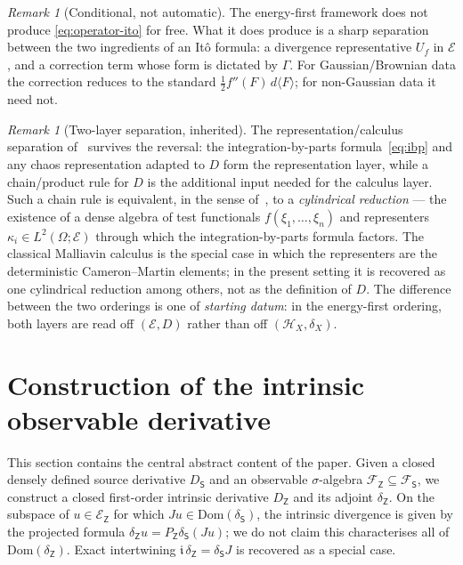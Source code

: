 \documentclass[11pt,reqno]{amsart}
\theoremstyle{plain}
\theoremstyle{definition}
\theoremstyle{remark}
\newtheorem{remark}[theorem]{Remark}
\newcommand{\Dom}{\mathrm{Dom}}
\newcommand{\Energy}{\mathcal{E}}
\newcommand{\Source}{\mathsf{S}}
\newcommand{\Obs}{\mathsf{Z}}
\renewcommand{\iota}{\mathfrak{i}}
\newcommand{\Carre}{\Gamma}
\begin{document}
\begin{remark}[Conditional, not automatic]\label{rem:conditional}
The energy-first framework does not produce \cref{eq:operator-ito}
for free. What it does produce is a sharp separation between the
two ingredients of an It\^o formula: a divergence representative
$U_f$ in $\Energy$, and a correction term whose form is dictated by
$\Carre$. For Gaussian/Brownian data the correction reduces to the
standard $\tfrac12 f''(F)\,d\langle F\rangle$; for non-Gaussian data
it need not.
\end{remark}

\begin{remark}[Two-layer separation, inherited]\label{rem:two-layer}
The representation/calculus separation
of~\cite{Fontes-OperatorDerivative} survives the reversal: the
integration-by-parts formula~\eqref{eq:ibp} and any chaos representation
adapted to $D$ form the representation layer, while a chain/product
rule for $D$ is the additional input needed for the calculus layer. Such
a chain rule is equivalent, in the sense
of~\cite[Thm.~B]{Fontes-OperatorDerivative}, to a \emph{cylindrical
reduction} --- the existence of a dense algebra of test functionals
$f(\xi_1,\dots,\xi_n)$ and representers $\kappa_i\in L^2(\Omega;\Energy)$
through which the integration-by-parts formula factors. The classical
Malliavin calculus is the special case in which the representers are the
deterministic Cameron--Martin elements; in the present setting it is
recovered as one cylindrical reduction among others, not as the
definition of $D$. The difference between the two orderings is one of
\emph{starting datum}: in the energy-first ordering, both layers are
read off $(\Energy, D)$ rather than off $(\mathcal H_X, \delta_X)$.
\end{remark}

\section{Construction of the intrinsic observable derivative}\label{sec:compat}

This section contains the central abstract content of the paper. Given
a closed densely defined source derivative $D_\Source$ and an observable
$\sigma$-algebra $\mathcal F_\Obs\subseteq\mathcal F_\Source$, we
construct a closed first-order intrinsic derivative $D_\Obs$ and its
adjoint $\delta_\Obs$. On the subspace of $u\in\Energy_\Obs$ for which
$Ju\in\Dom(\delta_\Source)$, the intrinsic divergence is given by the
projected formula $\delta_\Obs u=P_\Obs\delta_\Source(Ju)$; we do not
claim this characterises all of $\Dom(\delta_\Obs)$. Exact intertwining
$\iota\,\delta_\Obs=\delta_\Source J$ is recovered as a special case.
\end{document}
